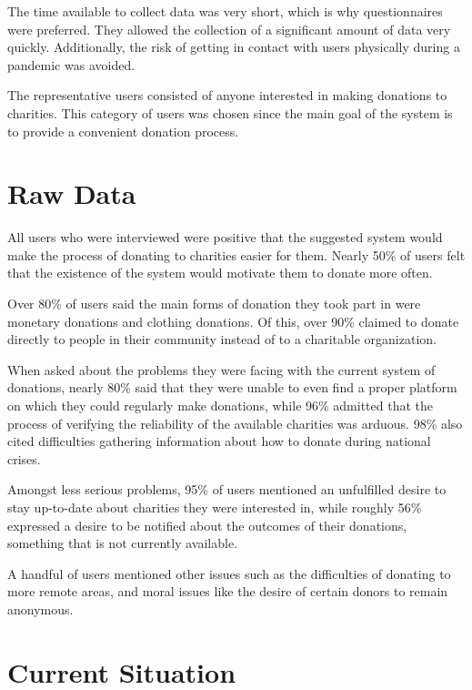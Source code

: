 \documentclass{scrreprt}
\begin{document}
    The time available to collect data was very short, which is why questionnaires were preferred. They allowed the collection of a significant amount of data very quickly. Additionally, the risk of getting in contact with users physically during a pandemic was avoided. \par
    
    The representative users consisted of anyone interested in making donations to charities. This category of users was chosen since the main goal of the system is to provide a convenient donation process.
    
    \section{Raw Data}
    
    All users who were interviewed were positive that the suggested system would make the process of donating to charities easier for them. Nearly 50\% of users felt that the existence of the system would motivate them to donate more often.\par
    
    Over 80\% of users said the main forms of donation they took part in were monetary donations and clothing donations. Of this, over 90\% claimed to donate directly to people in their community instead of to a charitable organization.\par
    
    When asked about the problems they were facing with the current system of donations, nearly 80\% said that they were unable to even find a proper platform on which they could regularly make donations, while 96\% admitted that the process of verifying the reliability of the available charities was arduous. 98\% also cited difficulties gathering information about how to donate during national crises.\par
    
    Amongst less serious problems, 95\% of users mentioned an unfulfilled desire to stay up-to-date about charities they were interested in, while roughly 56\% expressed a desire to be notified about the outcomes of their donations, something that is not currently available.\par
    
    A handful of users mentioned other issues such as the difficulties of donating to more remote areas, and moral issues like the desire of certain donors to remain anonymous.
    
    \section{Current Situation}
    
\end{document}
